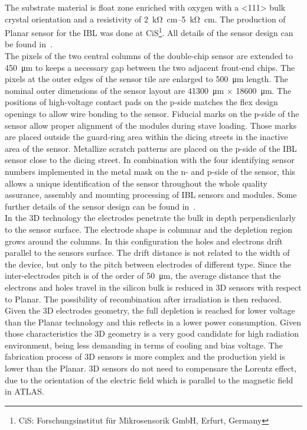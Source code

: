 The substrate material is float zone enriched with oxygen with a <111> bulk crystal orientation and a resistivity of \SIrange{2}{5}{\kilo\ohm\centi\meter}.
The production of Planar sensor for the IBL was done at CiS\footnote{CiS: Forschungsinstitut f\"ur Mikrosensorik GmbH, Erfurt, Germany}. All details of the sensor design can be found in~\cite{WittigPhd}.\\
The pixels of the two central columns of the double-chip sensor are extended to \SI{450}{\micro\meter} to keeps a necessary gap between the two adjacent front-end chips. The pixels at the outer edges of the sensor tile are enlarged to \SI{500}{\micro\meter} length. The nominal outer dimensions of the sensor layout are \SI{41300}{\micro\meter} $\times$ \SI{18600}{\micro\meter}.
The positions of high-voltage contact pads on the p-side matches the flex design openings to allow wire bonding to the sensor. Fiducial marks on the p-side of the sensor allow proper alignment of the modules during stave loading. Those marks are placed outside the guard-ring area within the dicing streets in the inactive area of the sensor.
Metallize scratch patterns are placed on the p-side of the IBL sensor close to the dicing street. In combination with the four identifying sensor numbers implemented in the metal mask on the n- and p-side of the sensor, this allows a unique identification of the sensor throughout the whole quality assurance, assembly and mounting processing of IBL sensors and modules. Some further details of the sensor design can be found in~\cite{WittigPhd}.\\
In the 3D technology the electrodes penetrate the bulk in depth perpendicularly to the sensor surface. The electrode shape is columnar and the depletion region grows around the columns. In this configuration the holes and electrons drift parallel to the sensors surface. The drift distance is not related to the width of the device, but only to the pitch between electrodes of different type. Since the inter-electrodes pitch is of the order of \SI{50}{\micro\meter}, the average distance that the electrons and holes travel in the silicon bulk is reduced in 3D sensors with respect to Planar. The possibility of recombination after irradiation is then reduced. Given the 3D electrodes geometry, the full depletion is reached for lower voltage than the Planar technology and this reflects in a lower power consumption. Given those characteristics the 3D geometry is a very good candidate for high radiation environment, being less demanding in terms of cooling and bias voltage. The fabrication process of 3D sensors is more complex and the production yield is lower than the Planar. 3D sensors do not need to compensare the Lorentz effect, due to the orientation of the electric field which is parallel to the magnetic field in ATLAS.
